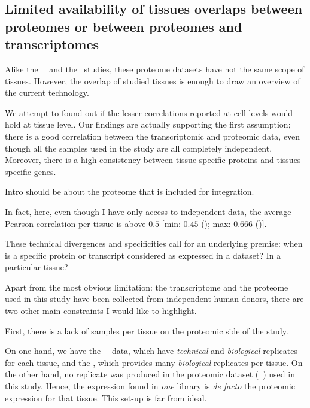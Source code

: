 \subsection{Limited availability of tissues overlaps between proteomes
or between proteomes and transcriptomes}

Alike the \uhlen\ \etal\ and the \gtex\ studies,
these proteome datasets have not the same scope of tissues.
However, the overlap of
studied tissues is enough to draw an overview of the current technology.

We attempt to found out if the lesser correlations reported at cell levels would
hold at tissue level.
Our findings are actually supporting the first assumption; there is a good correlation
between the transcriptomic and proteomic data, even though all the samples used in
the study are all completely independent. Moreover, there is a high consistency
between tissue-specific proteins and tissues-specific genes.










Intro should be about the proteome that is included for integration.


In fact, here, even though I have only access to independent data,
the average Pearson correlation per tissue is above $0.5$
$[$min: $0.45$ (\Oesophagus); max: $0.666$ (\Liver)$]$.



These technical divergences and specificities call for an underlying premise:
when is a specific protein or transcript considered as expressed in a dataset?
In a particular tissue?

Apart from the most obvious limitation: the transcriptome and the proteome used in
this study have been collected from independent human donors, there are
two other main constraints I would like to highlight.

First, there is a lack of samples per tissue on the proteomic side of the study.

On one hand, we have the \uhlen\ \etal\ data, which have \emph{technical}
and \emph{biological} replicates for each tissue, and the \gtex, which
provides many \emph{biological} replicates per tissue. On the other hand, no
replicate was produced in the proteomic dataset (\pandey\ \etal) used
in this study. Hence, the expression found in \emph{one} library is
\textit{de facto} the proteomic expression for that tissue.
This set-up is far from ideal.

